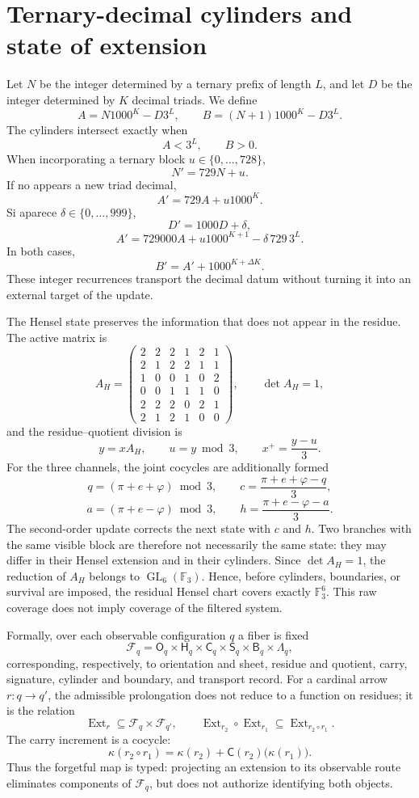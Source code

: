 \section{Ternary-decimal cylinders and state of extension}

Let \(N\) be the integer determined by a ternary prefix of length
\(L\), and let \(D\) be the integer determined by
\(K\) decimal triads. We define
\[
 A=N1000^K-D3^L,
 \qquad
 B=(N+1)1000^K-D3^L.
\]
The cylinders intersect exactly when
\[
 \boxed{A<3^L,\qquad B>0.}
\]
When incorporating a ternary block \(u\in\{0,\ldots,728\}\),
\[
 N'=729N+u.
\]
If no appears a new triad decimal,
\[
 A'=729A+u1000^K.
\]
Si aparece \(\delta\in\{0,\ldots,999\}\),
\[
 D'=1000D+\delta,
\]
\[
 A'=729000A+u1000^{K+1}-\delta\,729\,3^L.
\]
In both cases,
\[
 B'=A'+1000^{K+\Delta K}.
\]
These integer recurrences transport the decimal datum without turning it into an
external target of the update.

The Hensel state preserves the information that does not appear in the residue. The
active matrix is
\[
A_H=\begin{pmatrix}
2&2&2&1&2&1\\2&1&2&2&1&1\\1&0&0&1&0&2\\
0&0&1&1&1&0\\2&2&2&0&2&1\\2&1&2&1&0&0
\end{pmatrix},\qquad \det A_H=1,
\]
and the residue--quotient division is
\[
 y=xA_H,\qquad u=y\bmod3,\qquad x^+=\frac{y-u}{3}.
\]
For the three channels, the joint cocycles are additionally formed
\[
 q=(\pi+e+\varphi)\bmod3,
 \qquad
 c=\frac{\pi+e+\varphi-q}{3},
\]
\[
 a=(\pi+e-\varphi)\bmod3,
 \qquad
 h=\frac{\pi+e-\varphi-a}{3}.
\]
The second-order update corrects the next state with \(c\) and \(h\). Two branches with the same visible block are therefore not necessarily the same state: they may differ in their Hensel extension and in their cylinders. Since \(\det A_H=1\), the reduction of \(A_H\) belongs to \(\operatorname{GL}_6(\mathbb F_3)\). Hence, before cylinders, boundaries, or survival are imposed, the residual Hensel chart covers exactly \(\mathbb F_3^6\). This raw coverage does not imply coverage of the filtered system.

Formally, over each observable configuration \(q\) a fiber is fixed
\[
 \mathcal F_q=
 \mathsf O_q\times\mathsf H_q\times\mathsf C_q\times
 \mathsf S_q\times\mathsf B_q\times\mathsf\Lambda_q,
\]
corresponding, respectively, to orientation and sheet, residue and quotient,
carry, signature, cylinder and boundary, and transport record. For a
cardinal arrow \(r:q\to q'\), the admissible prolongation does not reduce to a
function on residues; it is the relation
\[
 \operatorname{Ext}_r\subseteq\mathcal F_q\times\mathcal F_{q'},
 \qquad
 \operatorname{Ext}_{r_2}\circ\operatorname{Ext}_{r_1}
 \subseteq\operatorname{Ext}_{r_2\circ r_1}.
\]
The carry increment is a cocycle:
\[
 \kappa(r_2\circ r_1)
 =\kappa(r_2)+\mathsf C(r_2)\bigl(\kappa(r_1)\bigr).
\]
Thus the forgetful map is typed: projecting an extension to its
observable route eliminates components of \(\mathcal F_q\), but does not authorize
identifying both objects.

